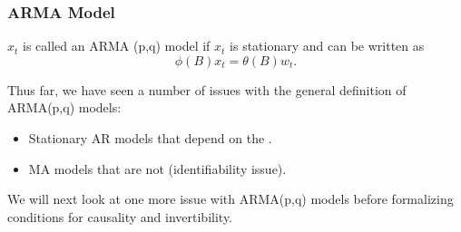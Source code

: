 \documentclass[%
xcolor=pdftex]{beamer}
\begin{document}
\begin{frame}
\frametitle{ARMA Model}

$x_t$ is called an ARMA (p,q) model if $x_t$ is stationary and
can be written as
 $$
 \phi(B) x_t=\theta(B) w_t.
 $$

Thus far, we have seen a number of issues with the general definition of ARMA(p,q) models:

\begin{itemize}
\item Stationary AR models that depend on the \underline{\hspace{10 mm}}.
\item MA models that are not \underline{\hspace{10 mm}} (identifiability issue).
\end{itemize}

We will next look at one more issue with ARMA(p,q) models before formalizing conditions for causality and invertibility.

\end{frame}
\end{document}
